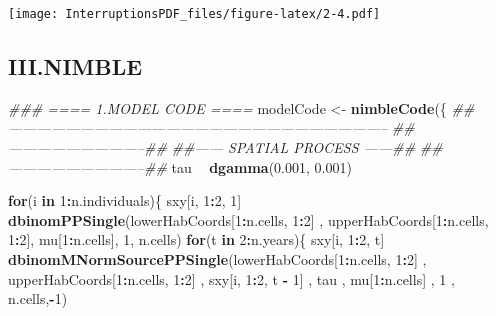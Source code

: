 \documentclass[
]{article}
\newenvironment{Shaded}{\begin{snugshade}}{\end{snugshade}}
\newcommand{\CommentTok}[1]{\textcolor[rgb]{0.56,0.35,0.01}{\textit{#1}}}
\newcommand{\ControlFlowTok}[1]{\textcolor[rgb]{0.13,0.29,0.53}{\textbf{#1}}}
\newcommand{\DecValTok}[1]{\textcolor[rgb]{0.00,0.00,0.81}{#1}}
\newcommand{\FloatTok}[1]{\textcolor[rgb]{0.00,0.00,0.81}{#1}}
\newcommand{\KeywordTok}[1]{\textcolor[rgb]{0.13,0.29,0.53}{\textbf{#1}}}
\newcommand{\NormalTok}[1]{#1}
\newcommand{\OperatorTok}[1]{\textcolor[rgb]{0.81,0.36,0.00}{\textbf{#1}}}
\newcommand{\StringTok}[1]{\textcolor[rgb]{0.31,0.60,0.02}{#1}}
\begin{document}
\texttt{[image: InterruptionsPDF\_files/figure-latex/2-4.pdf]}

\hypertarget{iii.nimble}{%
\subsection{III.NIMBLE}\label{iii.nimble}}

\begin{Shaded}
\begin{Highlighting}[]
\CommentTok{### ==== 1.MODEL CODE ==== }
\NormalTok{modelCode <-}\StringTok{ }\KeywordTok{nimbleCode}\NormalTok{(\{}
  \CommentTok{##--------------------------------------------------------------------------------}
  \CommentTok{##-----------------------------## }
  \CommentTok{##------ SPATIAL PROCESS ------##  }
  \CommentTok{##-----------------------------##  }
\NormalTok{  tau }\OperatorTok{~}\StringTok{ }\KeywordTok{dgamma}\NormalTok{(}\FloatTok{0.001}\NormalTok{, }\FloatTok{0.001}\NormalTok{)}
  
  \ControlFlowTok{for}\NormalTok{(i }\ControlFlowTok{in} \DecValTok{1}\OperatorTok{:}\NormalTok{n.individuals)\{}
\NormalTok{    sxy[i, }\DecValTok{1}\OperatorTok{:}\DecValTok{2}\NormalTok{, }\DecValTok{1}\NormalTok{] }\OperatorTok{~}\StringTok{ }\KeywordTok{dbinomPPSingle}\NormalTok{(lowerHabCoords[}\DecValTok{1}\OperatorTok{:}\NormalTok{n.cells, }\DecValTok{1}\OperatorTok{:}\DecValTok{2}\NormalTok{]}
\NormalTok{                                    , upperHabCoords[}\DecValTok{1}\OperatorTok{:}\NormalTok{n.cells, }\DecValTok{1}\OperatorTok{:}\DecValTok{2}\NormalTok{],}
\NormalTok{                                    mu[}\DecValTok{1}\OperatorTok{:}\NormalTok{n.cells], }\DecValTok{1}\NormalTok{, n.cells)}
    \ControlFlowTok{for}\NormalTok{(t }\ControlFlowTok{in} \DecValTok{2}\OperatorTok{:}\NormalTok{n.years)\{}
\NormalTok{      sxy[i, }\DecValTok{1}\OperatorTok{:}\DecValTok{2}\NormalTok{, t] }\OperatorTok{~}\StringTok{ }\KeywordTok{dbinomMNormSourcePPSingle}\NormalTok{(lowerHabCoords[}\DecValTok{1}\OperatorTok{:}\NormalTok{n.cells, }\DecValTok{1}\OperatorTok{:}\DecValTok{2}\NormalTok{]}
\NormalTok{                                                 , upperHabCoords[}\DecValTok{1}\OperatorTok{:}\NormalTok{n.cells, }\DecValTok{1}\OperatorTok{:}\DecValTok{2}\NormalTok{]}
\NormalTok{                                                 , sxy[i, }\DecValTok{1}\OperatorTok{:}\DecValTok{2}\NormalTok{, t }\OperatorTok{-}\StringTok{ }\DecValTok{1}\NormalTok{]}
\NormalTok{                                                 , tau}
\NormalTok{                                                 , mu[}\DecValTok{1}\OperatorTok{:}\NormalTok{n.cells]}
\NormalTok{                                                 , }\DecValTok{1}
\NormalTok{                                                 , n.cells,}\OperatorTok{-}\DecValTok{1}\NormalTok{)}


\end{Highlighting}
\end{Shaded}
\end{document}
